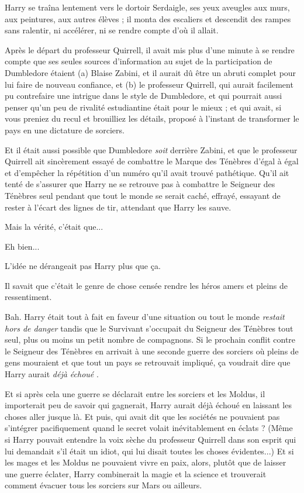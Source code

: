 Harry se traîna lentement vers le dortoir Serdaigle, ses yeux aveugles aux murs, aux peintures, aux autres élèves ; il monta des escaliers et descendit des rampes sans ralentir, ni accélérer, ni se rendre compte d'où il allait.

Après le départ du professeur Quirrell, il avait mis plus d'une minute à se rendre compte que ses seules sources d'information au sujet de la participation de Dumbledore étaient (a) Blaise Zabini, et il aurait dû être un abruti complet pour lui faire de nouveau confiance, et (b) le professeur Quirrell, qui aurait facilement pu contrefaire une intrigue dans le style de Dumbledore, et qui pourrait aussi penser qu'un peu de rivalité estudiantine était pour le mieux ; et qui avait, si vous preniez du recul et brouilliez les détails, proposé à l'instant de transformer le pays en une dictature de sorciers.

Et il était aussi possible que Dumbledore \emph{soit}  derrière Zabini, et que le professeur Quirrell ait sincèrement essayé de combattre le Marque des Ténèbres d'égal à égal et d'empêcher la répétition d'un numéro qu'il avait trouvé pathétique. Qu'il ait tenté de s'assurer que Harry ne se retrouve pas à combattre le Seigneur des Ténèbres seul pendant que tout le monde se serait caché, effrayé, essayant de rester à l'écart des lignes de tir, attendant que Harry les sauve.

Mais la vérité, c'était que...

Eh bien...

L'idée ne dérangeait pas Harry plus que ça.

Il savait que c'était le genre de chose censée rendre les héros amers et pleins de ressentiment.

Bah. Harry était tout à fait en faveur d'une situation ou tout le monde \emph{restait hors de danger}  tandis que le Survivant s'occupait du Seigneur des Ténèbres tout seul, plus ou moins un petit nombre de compagnons. Si le prochain conflit contre le Seigneur des Ténèbres en arrivait à une seconde guerre des sorciers où pleins de gens mouraient et que tout un pays se retrouvait impliqué, ça voudrait dire que Harry aurait \emph{déjà échoué} .

Et si après cela une guerre se déclarait entre les sorciers et les Moldus, il importerait peu de savoir qui gagnerait, Harry aurait déjà échoué en laissant les choses aller jusque là. Et puis, qui avait dit que les sociétés ne pouvaient pas s'intégrer pacifiquement quand le secret volait inévitablement en éclats ? (Même si Harry pouvait entendre la voix sèche du professeur Quirrell dans son esprit qui lui demandait s'il était un idiot, qui lui disait toutes les choses évidentes...) Et si les mages et les Moldus ne pouvaient vivre en paix, alors, plutôt que de laisser une guerre éclater, Harry combinerait la magie et la science et trouverait comment évacuer tous les sorciers sur Mars ou ailleurs.

